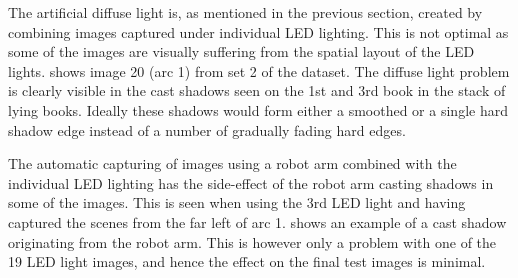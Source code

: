 \documentclass[thesis.tex]{subfiles}
\begin{document}
The artificial diffuse light is, as mentioned in the previous section, created by combining images captured under individual LED lighting. This is not optimal as some of the images are visually suffering from the spatial layout of the LED lights.  shows image 20 (arc 1) from set 2 of the dataset. The diffuse light problem is clearly visible in the cast shadows seen on the 1st and 3rd book in the stack of lying books. Ideally these shadows would form either a smoothed or a single hard shadow edge instead of a number of gradually fading hard edges.

The automatic capturing of images using a robot arm combined with the individual LED lighting has the side-effect of the robot arm casting shadows in some of the images. This is seen when using the 3rd LED light and having captured the scenes from the far left of arc 1.  shows an example of a cast shadow originating from the robot arm. This is however only a problem with one of the 19 LED light images, and hence the effect on the final test images is minimal. 
%
\end{document}
